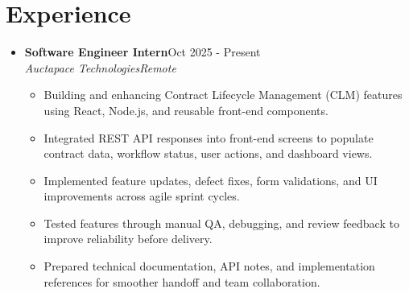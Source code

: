 \documentclass[letterpaper,10pt]{article}
\newcommand{\resumeItem}[1]{
  \item\small{
    {#1 \vspace{-2pt}}
  }
}
\newcommand{\resumeSubheading}[4]{
  \vspace{-2pt}\item
    \textbf{#1}\hfill \small #2 \\
    \textit{\small #3}\hfill \textit{\small #4}
    \vspace{-6pt}
}
\newcommand{\resumeSubHeadingListStart}{\begin{itemize}[leftmargin=0.15in, label={}, itemsep=0pt, topsep=2pt]}
\newcommand{\resumeSubHeadingListEnd}{\end{itemize}}
\newcommand{\resumeItemListStart}{\begin{itemize}[itemsep=0pt, topsep=1pt]}
\newcommand{\resumeItemListEnd}{\end{itemize}\vspace{-7pt}}
\begin{document}
\section{Experience}
  \resumeSubHeadingListStart
    \resumeSubheading
      {Software Engineer Intern}{Oct 2025 - Present}
      {Auctapace Technologies}{Remote}
      \resumeItemListStart
        \resumeItem{Building and enhancing Contract Lifecycle Management (CLM) features using React, Node.js, and reusable front-end components.}
        \resumeItem{Integrated REST API responses into front-end screens to populate contract data, workflow status, user actions, and dashboard views.}
        \resumeItem{Implemented feature updates, defect fixes, form validations, and UI improvements across agile sprint cycles.}
        \resumeItem{Tested features through manual QA, debugging, and review feedback to improve reliability before delivery.}
        \resumeItem{Prepared technical documentation, API notes, and implementation references for smoother handoff and team collaboration.}
      \resumeItemListEnd
  \resumeSubHeadingListEnd
\end{document}
